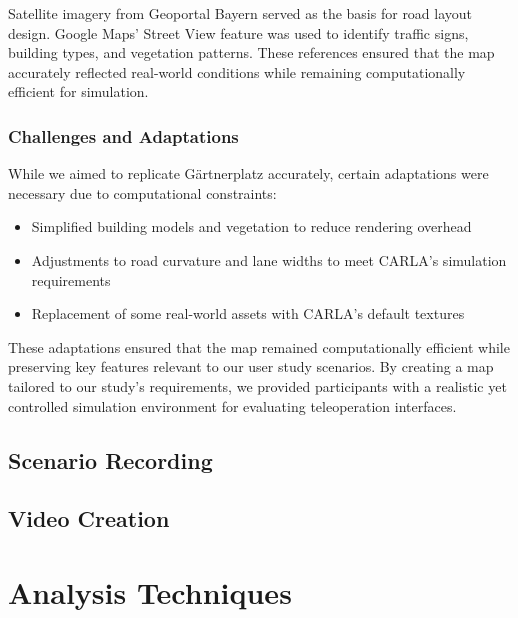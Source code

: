 Satellite imagery from Geoportal Bayern \cite{geoportal_bayern} served as the basis for road layout design. Google Maps' Street View feature was used to identify traffic signs, building types, and vegetation patterns. These references ensured that the map accurately reflected real-world conditions while remaining computationally efficient for simulation.

\subsubsection*{Challenges and Adaptations}
While we aimed to replicate Gärtnerplatz accurately, certain adaptations were necessary due to computational constraints:
\begin{itemize}
    \item Simplified building models and vegetation to reduce rendering overhead
    \item Adjustments to road curvature and lane widths to meet CARLA's simulation requirements
    \item Replacement of some real-world assets with CARLA's default textures
\end{itemize}

These adaptations ensured that the map remained computationally efficient while preserving key features relevant to our user study scenarios.
By creating a map tailored to our study's requirements, we provided participants with a realistic yet controlled simulation environment for evaluating teleoperation interfaces.
\subsection{Scenario Recording}
\subsection{Video Creation}
\section{Analysis Techniques}
